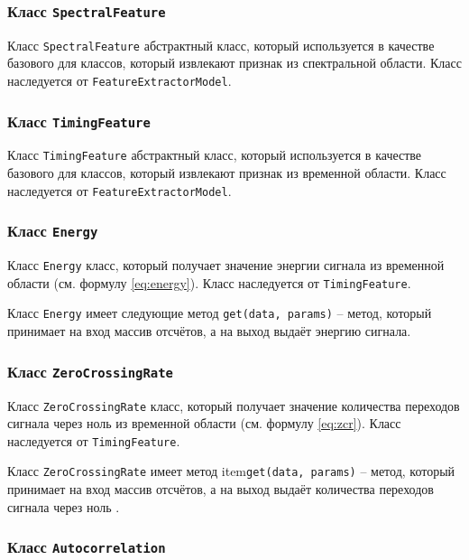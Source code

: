 \subsubsection{Класс \texttt{SpectralFeature}}

Класс \texttt{SpectralFeature} абстрактный класс, который используется в качестве базового для классов, который извлекают признак из спектральной области. Класс наследуется от \texttt{FeatureExtractorModel}.

\subsubsection{Класс \texttt{TimingFeature}}

Класс \texttt{TimingFeature} абстрактный класс, который используется в качестве базового для классов, который извлекают признак из временной области. Класс наследуется от \texttt{FeatureExtractorModel}.


\subsubsection{Класс \texttt{Energy}}

Класс \texttt{Energy} класс, который получает значение энергии сигнала из временной области (см. формулу \ref{eq:energy}). Класс наследуется от \texttt{TimingFeature}.

Класс \texttt{Energy} имеет следующие метод \texttt{get(data, params)} --  метод, который принимает на вход массив отсчётов, а на выход выдаёт энергию сигнала. 



\subsubsection{Класс \texttt{ZeroCrossingRate}}

Класс \texttt{ZeroCrossingRate} класс, который получает значение количества переходов сигнала через ноль из временной области (см. формулу \ref{eq:zcr}). Класс наследуется от \texttt{TimingFeature}.

Класс \texttt{ZeroCrossingRate} имеет метод item{\texttt{get(data, params)} --  метод, который принимает на вход массив отсчётов, а на выход выдаёт количества переходов сигнала через ноль . }


\subsubsection{Класс \texttt{Autocorrelation}}

